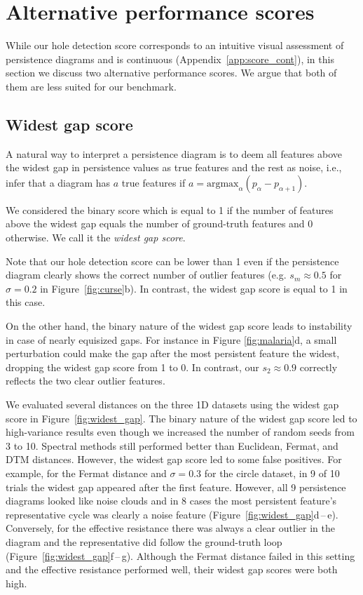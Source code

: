 \documentclass{article}
\theoremstyle{plain}
\theoremstyle{definition}
\theoremstyle{remark}
\begin{document}
\section{Alternative performance scores}\label{app:alt_scores}

While our hole detection score corresponds to an intuitive visual assessment of persistence diagrams and is continuous (Appendix~\ref{app:score_cont}), in this section we discuss two alternative performance scores. We argue that both of them are less suited for our benchmark.

\subsection{Widest gap score}
A natural way to interpret a persistence diagram is to deem all features above the widest gap in persistence values as true features and the rest as noise, i.e., infer that a diagram has $a$ true features if $a= \text{argmax}_{\alpha} (p_{\alpha} - p_{\alpha+1})$. 

We considered the binary score which is equal to 1 if the number of features above the widest gap equals the number of ground-truth features and 0 otherwise. We call it the \textit{widest gap score}.

Note that our hole detection score can be lower than 1 even if the persistence diagram clearly shows the correct number of outlier features (e.g. $s_m\approx 0.5$ for $\sigma = 0.2$ in Figure~\ref{fig:curse}b). In contrast, the widest gap score is equal to 1 in this case.

On the other hand, the binary nature of the widest gap score leads to instability in case of nearly equisized gaps. For instance in Figure \ref{fig:malaria}d, a small perturbation could make the gap after the most persistent feature the widest, dropping the widest gap score from 1 to 0. In contrast, our $s_2\approx 0.9$ correctly reflects the two clear outlier features.

We evaluated several distances on the three 1D datasets using the widest gap score in Figure~\ref{fig:widest_gap}. The binary nature of the widest gap score led to high-variance results even though we increased the number of random seeds from 3 to 10. Spectral methods still performed better than Euclidean, Fermat, and DTM distances. However, the widest gap score led to some false positives. For example, for the Fermat distance and $\sigma=0.3$ for the circle dataset, in 9 of 10 trials the widest gap appeared after the first feature. However, all 9 persistence diagrams looked like noise clouds and in 8 cases the most persistent feature's representative cycle was clearly a noise feature (Figure~\ref{fig:widest_gap}d\,--\,e). Conversely, for the effective resistance there was always a clear outlier in the diagram and the representative did follow the ground-truth loop (Figure~\ref{fig:widest_gap}f\,--\,g). Although the Fermat distance failed in this setting and the effective resistance performed well, their widest gap scores were both high.
\end{document}
